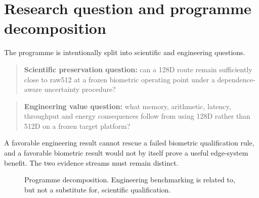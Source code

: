 \documentclass[10pt,a4paper]{article}
\begin{document}
\tableofcontents
\newpage

\section{Research question and programme decomposition}

The programme is intentionally split into scientific and engineering questions.

\begin{quote}
\textbf{Scientific preservation question:} can a 128D route remain sufficiently close to raw512 at a frozen
biometric operating point under a dependence-aware uncertainty procedure?
\end{quote}

\begin{quote}
\textbf{Engineering value question:} what memory, arithmetic, latency, throughput and energy consequences follow
from using 128D rather than 512D on a frozen target platform?
\end{quote}

A favorable engineering result cannot rescue a failed biometric qualification rule, and a favorable biometric
result would not by itself prove a useful edge-system benefit. The two evidence streams must remain distinct.

\begin{figure}[ht]
\centering
{}
\caption{Programme decomposition. Engineering benchmarking is related to, but not a substitute for, scientific
qualification.}
\end{figure}
\end{document}
